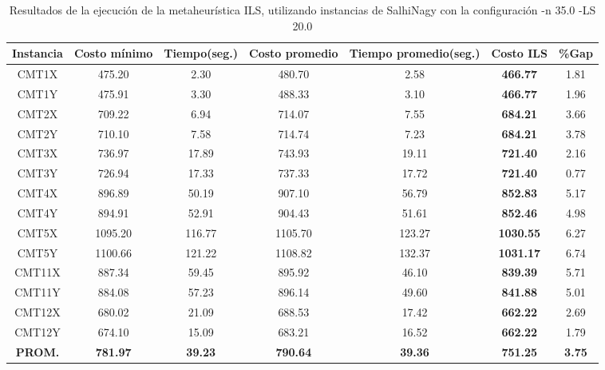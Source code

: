 \begin{table}[ht]
\caption{Resultados de la ejecución de la metaheurística ILS, utilizando instancias de SalhiNagy con la configuración -n 35.0 -LS 20.0}
\centering
\small
\begin{tabular}{c c c c c c c}
\hline\hline
Instancia & Costo mínimo & Tiempo(seg.) & Costo promedio & Tiempo promedio(seg.) & Costo ILS & \%Gap \\ [0.5ex]
\hline
CMT1X & 475.20 & 2.30 & 
480.70 & 2.58 & \bf{466.77} & 
1.81\\CMT1Y & 475.91 & 3.30 & 
488.33 & 3.10 & \bf{466.77} & 
1.96\\CMT2X & 709.22 & 6.94 & 
714.07 & 7.55 & \bf{684.21} & 
3.66\\CMT2Y & 710.10 & 7.58 & 
714.74 & 7.23 & \bf{684.21} & 
3.78\\CMT3X & 736.97 & 17.89 & 
743.93 & 19.11 & \bf{721.40} & 
2.16\\CMT3Y & 726.94 & 17.33 & 
737.33 & 17.72 & \bf{721.40} & 
0.77\\CMT4X & 896.89 & 50.19 & 
907.10 & 56.79 & \bf{852.83} & 
5.17\\CMT4Y & 894.91 & 52.91 & 
904.43 & 51.61 & \bf{852.46} & 
4.98\\CMT5X & 1095.20 & 116.77 & 
1105.70 & 123.27 & \bf{1030.55} & 
6.27\\CMT5Y & 1100.66 & 121.22 & 
1108.82 & 132.37 & \bf{1031.17} & 
6.74\\CMT11X & 887.34 & 59.45 & 
895.92 & 46.10 & \bf{839.39} & 
5.71\\CMT11Y & 884.08 & 57.23 & 
896.14 & 49.60 & \bf{841.88} & 
5.01\\CMT12X & 680.02 & 21.09 & 
688.53 & 17.42 & \bf{662.22} & 
2.69\\CMT12Y & 674.10 & 15.09 & 
683.21 & 16.52 & \bf{662.22} & 
1.79\\\bf{PROM.} & 
\bf{781.97} & \bf{39.23} & \bf{790.64} & \bf{39.36} & \bf{751.25} & \bf{3.75}\\[1ex]\hline
\end{tabular}
\label{table:nonlin}
\end{table} \clearpage
